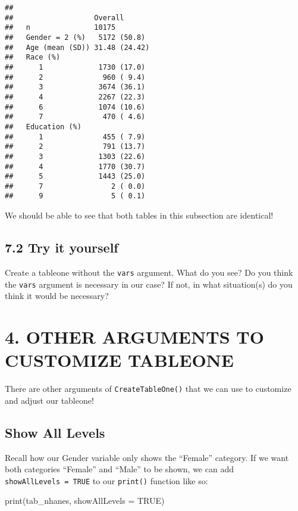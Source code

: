 \documentclass[
]{book}
\newenvironment{Shaded}{\begin{snugshade}}{\end{snugshade}}
\newcommand{\AttributeTok}[1]{\textcolor[rgb]{0.77,0.63,0.00}{#1}}
\newcommand{\ConstantTok}[1]{\textcolor[rgb]{0.00,0.00,0.00}{#1}}
\newcommand{\FunctionTok}[1]{\textcolor[rgb]{0.00,0.00,0.00}{#1}}
\newcommand{\NormalTok}[1]{#1}
\begin{document}
\begin{verbatim}
##                  
##                   Overall      
##   n               10175        
##   Gender = 2 (%)   5172 (50.8) 
##   Age (mean (SD)) 31.48 (24.42)
##   Race (%)                     
##      1             1730 (17.0) 
##      2              960 ( 9.4) 
##      3             3674 (36.1) 
##      4             2267 (22.3) 
##      6             1074 (10.6) 
##      7              470 ( 4.6) 
##   Education (%)                
##      1              455 ( 7.9) 
##      2              791 (13.7) 
##      3             1303 (22.6) 
##      4             1770 (30.7) 
##      5             1443 (25.0) 
##      7                2 ( 0.0) 
##      9                5 ( 0.1)
\end{verbatim}

We should be able to see that both tables in this subsection are identical!

\hypertarget{try-it-yourself-35}{%
\subsection{7.2 Try it yourself}\label{try-it-yourself-35}}

Create a tableone without the \texttt{vars} argument. What do you see?
Do you think the \texttt{vars} argument is necessary in our case? If not, in what situation(s) do you think it would be necessary?

\hypertarget{other-arguments-to-customize-tableone}{%
\section{4. OTHER ARGUMENTS TO CUSTOMIZE TABLEONE}\label{other-arguments-to-customize-tableone}}

There are other arguments of \texttt{CreateTableOne()} that we can use to customize and adjust our tableone!

\hypertarget{show-all-levels}{%
\subsection{Show All Levels}\label{show-all-levels}}

Recall how our Gender variable only shows the ``Female'' category. If we want both categories ``Female'' and ``Male'' to be shown, we can add \texttt{showAllLevels\ =\ TRUE} to our \texttt{print()} function like so:

\begin{Shaded}
\begin{Highlighting}[]
\FunctionTok{print}\NormalTok{(tab\_nhanes, }
      \AttributeTok{showAllLevels =} \ConstantTok{TRUE}\NormalTok{)}
\end{Highlighting}
\end{Shaded}
\end{document}
